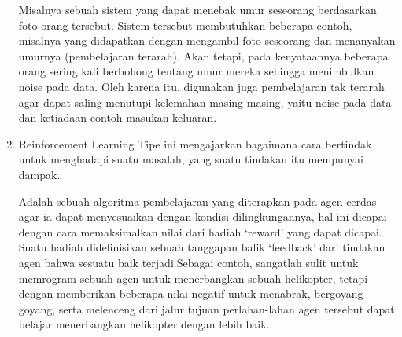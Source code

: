 \begin{enumerate}
       \par Misalnya sebuah sistem yang dapat menebak umur seseorang berdasarkan foto orang tersebut.  Sistem tersebut membutuhkan beberapa contoh, misalnya yang didapatkan dengan mengambil foto seseorang dan menanyakan umurnya (pembelajaran terarah). Akan tetapi, pada kenyataannya beberapa orang sering kali berbohong tentang umur mereka sehingga menimbulkan noise pada data. Oleh karena itu, digunakan juga pembelajaran tak terarah agar dapat saling menutupi kelemahan masing-masing, yaitu noise pada data dan ketiadaan contoh masukan-keluaran.
 \item Reinforcement Learning Tipe ini mengajarkan bagaimana cara bertindak untuk menghadapi suatu masalah, yang suatu tindakan itu mempunyai dampak. 
       \par Adalah sebuah algoritma pembelajaran yang diterapkan pada agen cerdas agar ia dapat menyesuaikan dengan kondisi dilingkungannya, hal ini dicapai dengan cara memaksimalkan nilai dari hadiah ‘reward’ yang dapat dicapai. Suatu hadiah didefinisikan sebuah tanggapan balik ‘feedback’ dari tindakan agen bahwa sesuatu baik terjadi.Sebagai contoh, sangatlah sulit untuk memrogram sebuah agen untuk menerbangkan sebuah helikopter, tetapi dengan memberikan beberapa nilai negatif untuk menabrak, bergoyang-goyang, serta melenceng dari jalur tujuan perlahan-lahan agen tersebut dapat belajar menerbangkan helikopter dengan lebih baik.
\end{enumerate}

